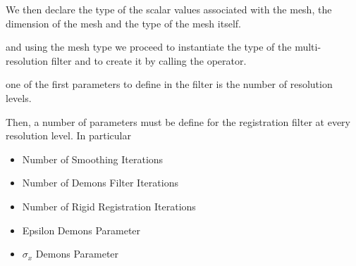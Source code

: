 \documentclass{InsightArticle}
\begin{document}
\begin{center}

\end{center}


We then declare the type of the scalar values associated with the mesh, the
dimension of the mesh and the type of the mesh itself.

\begin{center}

\end{center}

and using the mesh type we proceed to instantiate the type of the
multi-resolution filter and to create it by calling the  operator.

\begin{center}

\end{center}

one of the first parameters to define in the filter is the number of resolution levels.

\begin{center}

\end{center}

Then, a number of parameters must be define for the registration filter at every 
resolution level. In particular

\begin{itemize}
\item Number of Smoothing Iterations
\item Number of Demons Filter Iterations
\item Number of Rigid Registration Iterations
\item Epsilon Demons Parameter
\item $\sigma_x$ Demons Parameter
\end{itemize}




\clearpage


%
%



\end{document}
